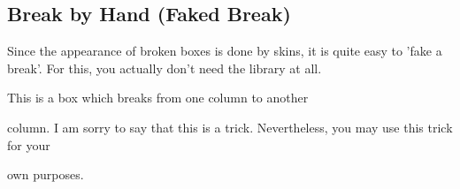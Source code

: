 \clearpage
\subsection{Break by Hand (Faked Break)}
Since the appearance of broken boxes is done by skins, it is quite easy
to 'fake a break'. For this, you actually don't need the
 library at
all.

\begin{dispExample}
%
\begin{tcolorbox}[title=My broken box,skin=enhancedfirst]
This is a box which breaks from one column to another
\end{tcolorbox}\hfill
\begin{tcolorbox}[skin=enhancedmiddle]
column. I am sorry to say that this is a trick.
Nevertheless, you may use this trick for your
\end{tcolorbox}\hfill
\begin{tcolorbox}[skin=enhancedlast]
own purposes.
\end{tcolorbox}
\end{dispExample}



